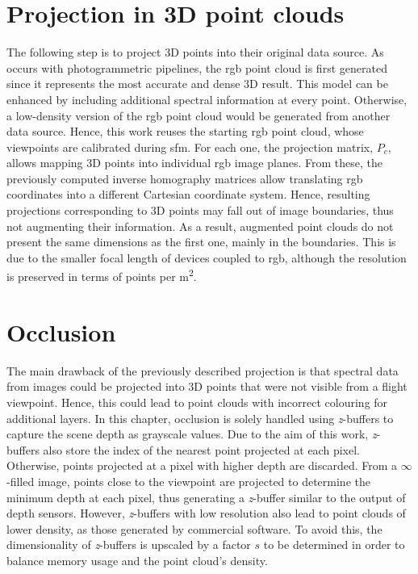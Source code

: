 \section{Projection in 3D point clouds}

The following step is to project 3D points into their original data source. As occurs with photogrammetric pipelines, the \acrshort{rgb} point cloud is first generated since it represents the most accurate and dense 3D result. This model can be enhanced by including additional spectral information at every point. Otherwise, a low-density version of the \acrshort{rgb} point cloud would be generated from another data source. Hence, this work reuses the starting \acrshort{rgb} point cloud, whose viewpoints are calibrated during \acrshort{sfm}. For each one, the projection matrix, $P_c$, allows mapping 3D points into individual \acrshort{rgb} image planes. From these, the previously computed inverse homography matrices allow translating \acrshort{rgb} coordinates into a different Cartesian coordinate system. Hence, resulting projections corresponding to 3D points may fall out of image boundaries, thus not augmenting their information. As a result, augmented point clouds do not present the same dimensions as the first one, mainly in the boundaries. This is due to the smaller focal length of devices coupled to \acrshort{rgb}, although the resolution is preserved in terms of points per \si{\meter\squared}.

\section{Occlusion}

The main drawback of the previously described projection is that spectral data from images could be projected into 3D points that were not visible from a flight viewpoint. Hence, this could lead to point clouds with incorrect colouring for additional layers. In this chapter, occlusion is solely handled using \textit{z}-buffers to capture the scene depth as grayscale values. Due to the aim of this work, \textit{z}-buffers also store the index of the nearest point projected at each pixel. Otherwise, points projected at a pixel with higher depth are discarded.  From a $\infty$-filled image, points close to the viewpoint are projected to determine the minimum depth at each pixel, thus generating a \textit{z}-buffer similar to the output of depth sensors. However, \textit{z}-buffers with low resolution also lead to point clouds of lower density, as those generated by commercial software. To avoid this, the dimensionality of \textit{z}-buffers is upscaled by a factor $s$ to be determined in order to balance memory usage and the point cloud's density.


